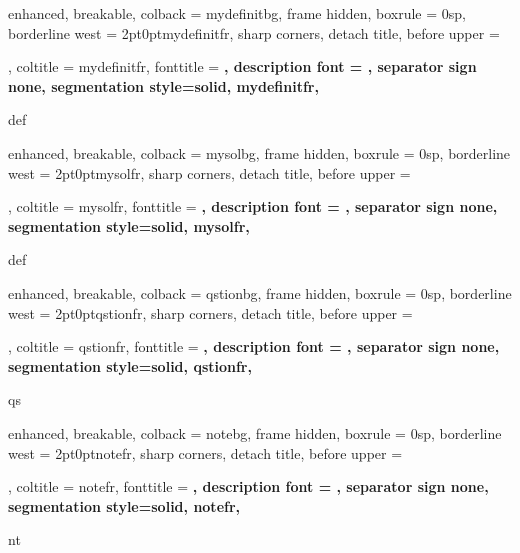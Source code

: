 {
	enhanced,
	breakable,
	colback = mydefinitbg,
	frame hidden,
	boxrule = 0sp,
	borderline west = {2pt}{0pt}{mydefinitfr},
	sharp corners,
	detach title,
	before upper = \tcbtitle\par\smallskip,
	coltitle = mydefinitfr,
	fonttitle = \bfseries\sffamily,
	description font = \mdseries,
	separator sign none,
	segmentation style={solid, mydefinitfr},
}
{def}



\makeatletter
{}
{
	enhanced,
	breakable,
	colback = mysolbg,
	frame hidden,
	boxrule = 0sp,
	borderline west = {2pt}{0pt}{mysolfr},
	sharp corners,
	detach title,
	before upper = \tcbtitle\par\smallskip,
	coltitle = mysolfr,
	fonttitle = \bfseries\sffamily,
	description font = \mdseries,
	separator sign none,
	segmentation style={solid, mysolfr},
}
{def}
\makeatother


\makeatletter
{}
{
	enhanced,
	breakable,
	colback = qstionbg,
	frame hidden,
	boxrule = 0sp,
	borderline west = {2pt}{0pt}{qstionfr},
	sharp corners,
	detach title,
	before upper = \tcbtitle\par\smallskip,
	coltitle = qstionfr,
	fonttitle = \bfseries\sffamily,
	description font = \mdseries,
	separator sign none,
	segmentation style={solid, qstionfr},
}
{qs}
\makeatother


{
	enhanced,
	breakable,
	colback = notebg,
	frame hidden,
	boxrule = 0sp,
	borderline west = {2pt}{0pt}{notefr},
	sharp corners,
	detach title,
	before upper = \tcbtitle\par\smallskip,
	coltitle = notefr,
	fonttitle = \bfseries\sffamily,
	description font = \mdseries,
	separator sign none,
	segmentation style={solid, notefr},
}
{nt}



